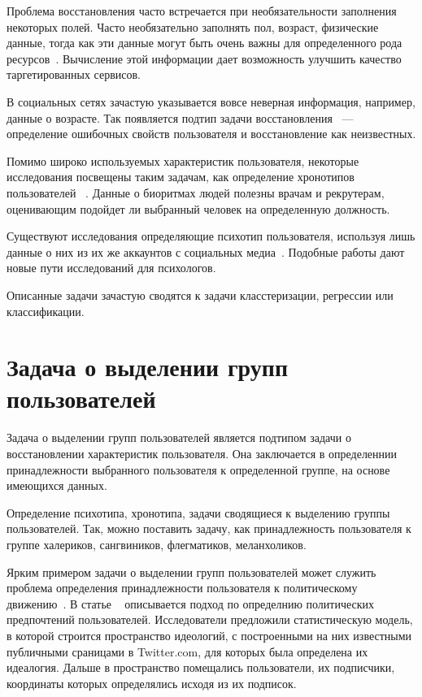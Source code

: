 \documentclass[annotation,times,page4]{itmo-student-thesis}
\begin{document}
Проблема восстановления часто встречается при необязательности заполнения некоторых полей. Часто необязательно заполнять пол, возраст, физические данные, тогда как эти данные могут быть очень важны для определенного рода ресурсов~\cite{peersman2011predicting, turdakov2013opredelenie, schwartz2013personality}. Вычисление этой информации дает возможность улучшить качество таргетированных сервисов.

В социальных сетях зачастую указывается вовсе неверная информация, например, данные о возрасте. Так появляется подтип задачи восстановления ~--- определение ошибочных свойств пользователя и восстановление как неизвестных.

Помимо широко используемых характеристик пользователя, некоторые исследования посвещены таким задачам, как определение хронотипов пользователей ~\cite{blachnio2015facebook}. Данные о биоритмах людей полезны врачам и рекрутерам, оценивающим подойдет ли выбранный человек на определенную должность.

Существуют исследования определяющие психотип пользователя, используя лишь данные о них из их же аккаунтов с социальных медиа~\cite{schwartz2013personality}. Подобные работы дают новые пути исследований для психологов.

Описанные задачи зачастую сводятся к задачи класстеризации, регрессии или классификации.

\section{Задача о выделении групп пользователей}
Задача о выделении групп пользователей является подтипом задачи о восстановлении характеристик пользователя. Она заключается в определеннии принадлежности выбранного пользователя к определенной группе, на основе имеющихся данных. 

Определение психотипа, хронотипа, задачи сводящиеся к выделению группы пользователей. Так, можно поставить задачу, как принадлежность пользователя к группе халериков, сангвиников, флегматиков, меланхоликов.

Ярким примером задачи о выделении групп пользователей может служить проблема определения принадлежности пользователя к политическому движению~\cite{barbera2015tweeting, yardi2010dynamic, lo2014common, bonica2013ideology, gruzd2014investigating}. В статье ~\cite{barbera2015tweeting} описывается подход по определнию политических предпочтений пользователей. Исследователи предложили статистическую модель, в которой строится пространство идеологий, с построенными на них известными публичными сраницами в Twitter.com, для которых была определена их идеалогия. Дальше в пространство помещались пользователи, их подписчики, координаты которых определялись исходя из их подписок.
\end{document}
